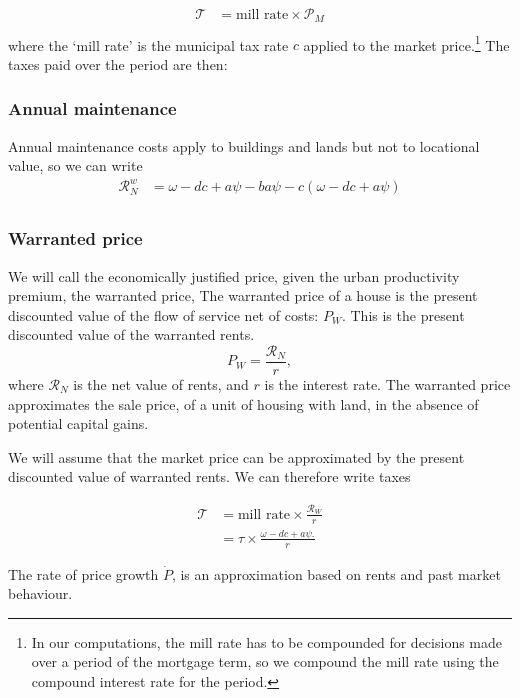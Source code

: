 \begin{align*}
\mathcal{T} &= \text{mill rate} \times \mathcal{P}_M \\
\end{align*}
where the `\gls{mill rate}' is the municipal tax rate $c$ applied to the market price.\footnote{In our computations, the mill rate  has to be compounded for decisions made over a period of the mortgage term, so we compound the mill rate using the \gls{compound interest rate} for the period.} The taxes paid over the period are then:

\subsubsection{Annual maintenance}
Annual maintenance costs apply to buildings and lands but not to locational value, so we can write
 \begin{align}
\mathcal{R}_N^w &= \omega - {dc}  + a\psi -   ba\psi - c(\omega-{dc}+a\psi) \\
\end{align}

\subsubsection{Warranted price} \label{section-warranted-price}

We will call the economically justified price, given the urban productivity premium, the \gls{warranted price}, 
The \gls{warranted price} of a house is the present discounted value of the flow of service net of costs: $P_W$. This is the present discounted value of the warranted rents.
\begin{equation}
  P_W=\frac{\mathcal{R}_N}{r},  
\label{eqn-price-warranted}
\end{equation}
where $\mathcal{R}_N$ is the net value of rents, and $r$ is the interest rate.  The warranted price approximates the sale price, of a unit of housing with land, in the absence of potential capital gains. 

We will assume that the market price can be approximated by the present discounted value of warranted  rents.  We can therefore write taxes

\begin{align*}
\mathcal{T} &= \text{mill rate} \times \frac{\mathcal{R}_W}{r} \\
&= \tau \times \frac{\omega- {dc} + a\psi.}{r}
\end{align*}


The rate of price growth $\dot P$, is an approximation based on rents and past market behaviour.

